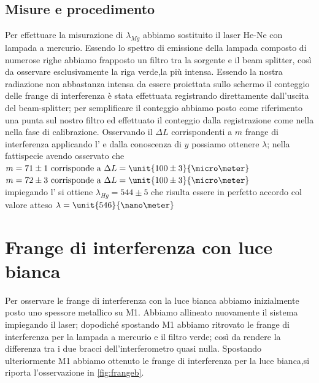 \subsection{Misure e procedimento}
Per effettuare la misurazione di $\lambda_{Mg}$
abbiamo sostituito il laser He-Ne con 
lampada a mercurio.
Essendo lo spettro di emissione della lampada 
composto di numerose righe
abbiamo frapposto un filtro tra la sorgente e il beam splitter,
così da osservare esclusivamente la riga verde,la più intensa.
Essendo la nostra radiazione non abbastanza intensa da essere 
proiettata sullo schermo il conteggio delle frange di interferenza
è stata effettuata registrando direttamente dall'uscita del beam-splitter; 
per semplificare il conteggio abbiamo 
posto come riferimento una punta sul nostro filtro ed effettuato il conteggio 
dalla registrazione come nella nella fase di calibrazione.
Osservando il $\Delta L$ corrispondenti a $m$ frange di
interferenza applicando l' e dalla conoscenza di $y$ 
possiamo ottenere $\lambda$;
nella fattispecie avendo osservato che
\\
 $m=71 \pm 1\text{ corrisponde a } \Delta L =\unit{100\pm 3}{\micro\meter}$
 \\
 $m=72 \pm 3\text{ corrisponde a } \Delta L =\unit{100\pm 3}{\micro\meter}$
 \\
impiegando l' si ottiene $\lambda_{Hg}=544\pm 5$ che 
risulta essere in perfetto accordo col valore atteso 	
$\lambda = \unit{546}{\nano\meter}$
\section{Frange di interferenza con luce bianca}
Per osservare le frange di interferenza con la luce bianca
abbiamo inizialmente posto uno spessore metallico su M1.
Abbiamo allineato nuovamente il sistema impiegando il laser;
dopodiché spostando M1 abbiamo ritrovato le frange di interferenza
per la lampada a mercurio e il filtro verde; così da rendere 
la differenza tra i due bracci dell'interferometro quasi nulla.
Spostando ulteriormente M1 abbiamo ottenuto le frange di interferenza per
la luce bianca,si riporta l'osservazione in \figurename{ \ref{fig:frangeb}}.


